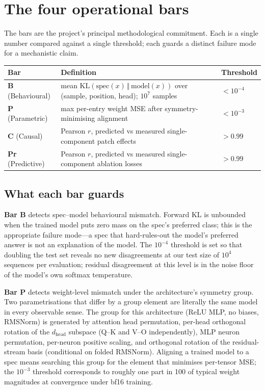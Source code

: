 \documentclass[11pt,letterpaper]{article}
\begin{document}
\section{The four operational bars}
\label{sec:bars}

The bars are the project's principal methodological commitment. Each is a single number compared against a single threshold; each guards a distinct failure mode for a mechanistic claim.

\begin{center}
\begin{tabular}{lll}
\toprule
Bar & Definition & Threshold \\
\midrule
\textbf{B} (Behavioural) & mean $\mathrm{KL}(\mathrm{spec}(x) \,\Vert\, \mathrm{model}(x))$ over (sample, position, head); $10^7$ samples & $< 10^{-4}$ \\
\textbf{P} (Parametric) & max per-entry weight MSE after symmetry-minimising alignment & $< 10^{-3}$ \\
\textbf{C} (Causal) & Pearson $r$, predicted vs measured single-component patch effects & $> 0.99$ \\
\textbf{Pr} (Predictive) & Pearson $r$, predicted vs measured single-component ablation losses & $> 0.99$ \\
\bottomrule
\end{tabular}
\end{center}

\subsection{What each bar guards}

\textbf{Bar B} detects spec--model behavioural mismatch. Forward KL is unbounded when the trained model puts zero mass on the spec's preferred class; this is the appropriate failure mode---a spec that hard-rules-out the model's preferred answer is not an explanation of the model. The $10^{-4}$ threshold is set so that doubling the test set reveals no new disagreements at our test size of $10^4$ sequences per evaluation; residual disagreement at this level is in the noise floor of the model's own softmax temperature.

\textbf{Bar P} detects weight-level mismatch under the architecture's symmetry group. Two parametrisations that differ by a group element are literally the same model in every observable sense. The group for this architecture (ReLU MLP, no biases, RMSNorm) is generated by attention head permutation, per-head orthogonal rotation of the $d_{\mathrm{head}}$ subspace (Q--K and V--O independently), MLP neuron permutation, per-neuron positive scaling, and orthogonal rotation of the residual-stream basis (conditional on folded RMSNorm). Aligning a trained model to a spec means searching this group for the element that minimises per-tensor MSE; the $10^{-3}$ threshold corresponds to roughly one part in 100 of typical weight magnitudes at convergence under bf16 training.
\end{document}
